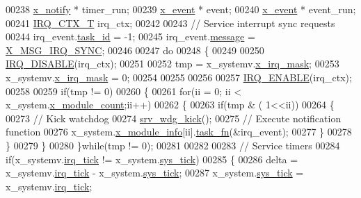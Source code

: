 \begin{DoxyCode}
{00238     \hyperlink{a00036_df/d4c/a00851}{x\_notify}          * timer\_run;
00239     \hyperlink{a00036_de/d37/a00849}{x\_event}           * event;
00240     \hyperlink{a00036_de/d37/a00849}{x\_event}           * event\_run;
00241     \hyperlink{a00033_a6d4f0a7397640f5b011ca9c39d47dc72}{IRQ\_CTX\_T}         irq\_ctx;
00242 
00243     \textcolor{comment}{// Service interrupt sync requests}
00244     irq\_event.\hyperlink{a00036_a21b41e494a28583d4da10f1afb1c5328}{task\_id} = -1;
00245     irq\_event.\hyperlink{a00036_adf9665938515a20c283eea2c978cf80d}{message} = \hyperlink{a00036_a104f1137aafb33160da80932fe63c40d}{X\_MSG\_IRQ\_SYNC};
00246 
00247     \textcolor{keywordflow}{do}
00248     \{
00249 
00250         \hyperlink{a00033_a357168bbe78739811cdb7b5576714ca6}{IRQ\_DISABLE}(irq\_ctx);
00251 
00252         tmp = x\_systemv.\hyperlink{a00037_a1385e454a9fbfdfe2af2b8a743789483}{x\_irq\_mask};
00253         x\_systemv.\hyperlink{a00037_a1385e454a9fbfdfe2af2b8a743789483}{x\_irq\_mask} = 0;
00254 
00255 
00256 
00257         \hyperlink{a00033_abc8e0f43382f8b0fdf60d35a93c20c57}{IRQ\_ENABLE}(irq\_ctx);
00258 
00259         \textcolor{keywordflow}{if}(tmp != 0)
00260         \{
00261             \textcolor{keywordflow}{for}(ii = 0; ii < x\_system.\hyperlink{a00037_a80c19e87a59b3ee9def711195641cd26}{x\_module\_count};ii++)
00262             \{
00263                 \textcolor{keywordflow}{if}(tmp & ( 1<<ii))
00264                 \{
00273                     \textcolor{comment}{// Kick watchdog}
00274                     \hyperlink{a00067_a710d148845397582739d170341f3d3d9}{srv\_wdg\_kick}();
00275                     \textcolor{comment}{// Execute notification function}
00276                     x\_system.\hyperlink{a00037_a6724d1e1430a0e89c134b30152988385}{x\_module\_info}[ii].\hyperlink{a00037_ab14ce9c8fe0edb516f7f3d4e1e3a8854}{task\_fn}(&irq\_event);
00277                 \}
00278             \}
00279         \}
00280     \}\textcolor{keywordflow}{while}(tmp != 0);
00281 
00282 
00283     \textcolor{comment}{// Service timers}
00284     \textcolor{keywordflow}{if}(x\_systemv.\hyperlink{a00037_ab73fa103937ad39e7e2fc55783c4c370}{irq\_tick} != x\_system.\hyperlink{a00037_aab260797348ca628ed4820714e229a74}{sys\_tick})
00285     \{
00286         delta =  x\_systemv.\hyperlink{a00037_ab73fa103937ad39e7e2fc55783c4c370}{irq\_tick} - x\_system.\hyperlink{a00037_aab260797348ca628ed4820714e229a74}{sys\_tick};
00287         x\_system.\hyperlink{a00037_aab260797348ca628ed4820714e229a74}{sys\_tick} = x\_systemv.\hyperlink{a00037_ab73fa103937ad39e7e2fc55783c4c370}{irq\_tick};
}
\end{DoxyCode}
